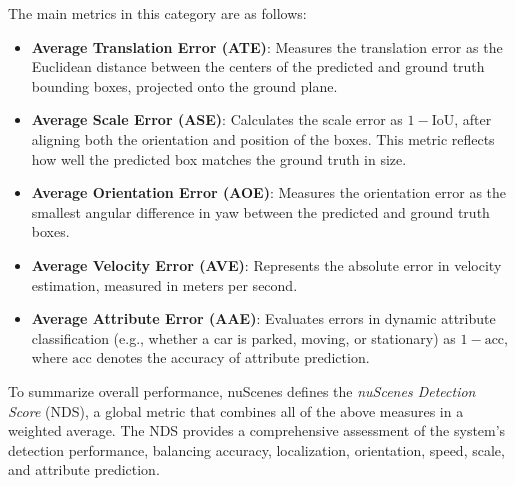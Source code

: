 The main metrics in this category are as follows:
\begin{itemize}
    \item \textbf{Average Translation Error (ATE)}: Measures the translation error as the Euclidean distance between the centers of the predicted and ground truth bounding boxes, projected onto the ground plane.
    
    \item \textbf{Average Scale Error (ASE)}: Calculates the scale error as $1 - \text{IoU}$, after aligning both the orientation and position of the boxes. This metric reflects how well the predicted box matches the ground truth in size.
    
    \item \textbf{Average Orientation Error (AOE)}: Measures the orientation error as the smallest angular difference in yaw between the predicted and ground truth boxes.
    
    \item \textbf{Average Velocity Error (AVE)}: Represents the absolute error in velocity estimation, measured in meters per second.
    
    \item \textbf{Average Attribute Error (AAE)}: Evaluates errors in dynamic attribute classification (e.g., whether a car is parked, moving, or stationary) as $1 - \text{acc}$, where $\text{acc}$ denotes the accuracy of attribute prediction.
\end{itemize}

To summarize overall performance, nuScenes defines the \textit{nuScenes Detection Score} (NDS), a global metric that combines all of the above measures in a weighted average. The NDS provides a comprehensive assessment of the system's detection performance, balancing accuracy, localization, orientation, speed, scale, and attribute prediction.




